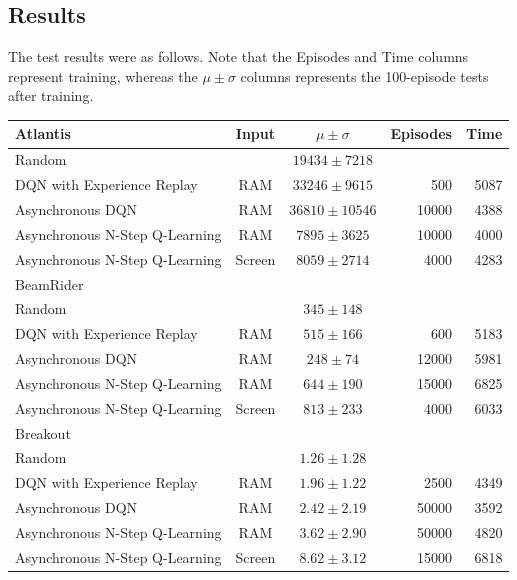 \documentclass[11pt]{article}
\begin{document}
\subsection{Results}

The test results were as follows. Note that the Episodes and Time columns represent training, whereas the $\mu\pm\sigma$ columns represents the 100-episode tests after training.
\begin{center}
\begin{tabular}{ l | c | c | r | r }
 Atlantis                       & Input     & $\mu\pm\sigma$    & Episodes  & Time  \\ \hline
 Random                         &           & $19434 \pm 7218$  &           &       \\
 DQN with Experience Replay     & RAM       & $33246 \pm 9615$  & 500       & 5087  \\
 Asynchronous DQN               & RAM       & $36810 \pm 10546$ & 10000     & 4388  \\
 Asynchronous N-Step Q-Learning & RAM       & $7895 \pm 3625$   & 10000     & 4000  \\
 Asynchronous N-Step Q-Learning & Screen    & $8059 \pm 2714$   & 4000      & 4283  \\ \hline\hline
 BeamRider                      &           &                   &           &       \\ \hline
 Random                         &           & $345 \pm 148$     &           &       \\
 DQN with Experience Replay     & RAM       & $515 \pm 166$     & 600       & 5183  \\
 Asynchronous DQN               & RAM       & $248 \pm 74$      & 12000     & 5981 \\
 Asynchronous N-Step Q-Learning & RAM       & $644 \pm 190$     & 15000     & 6825  \\
 Asynchronous N-Step Q-Learning & Screen    & $813 \pm 233$     & 4000      & 6033  \\ \hline\hline
 Breakout                       &           &                   &           &       \\ \hline
 Random                         &           & $1.26 \pm 1.28$   &           &       \\
 DQN with Experience Replay     & RAM       & $1.96 \pm 1.22$   & 2500      & 4349  \\
 Asynchronous DQN               & RAM       & $2.42 \pm 2.19$   & 50000     & 3592  \\
 Asynchronous N-Step Q-Learning & RAM       & $3.62 \pm 2.90$   & 50000     & 4820  \\
 Asynchronous N-Step Q-Learning & Screen    & $8.62 \pm 3.12$   & 15000     & 6818
\end{tabular}
\end{center}
\end{document}
